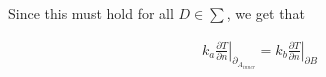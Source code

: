 Since this must hold for all $D \in \sum$, we get that

\begin{gather*}
\left.k_a\frac{\partial T}{\partial n}\right|_{\partial_{A_{inner}}} = \left.k_b\frac{\partial T}{\partial n}\right|_{\partial B}
\end{gather*}

%

